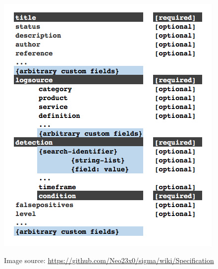 \includegraphics[scale=0.525]{figures/new-rule-format/Sigma_Schema.png}

Image source: \url{https://github.com/Neo23x0/sigma/wiki/Specification}

